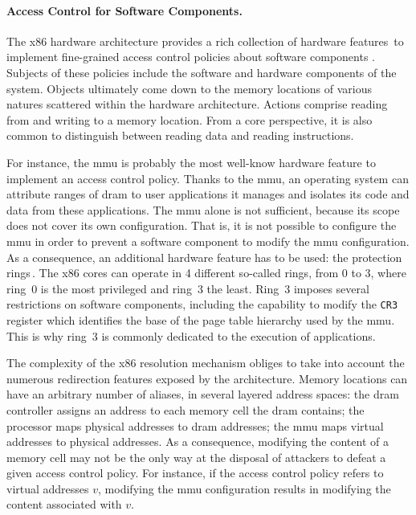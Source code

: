 \paragraph{Access Control for Software Components.}
%
The x86 hardware architecture provides a rich collection of hardware
features\,\cite[Volume 3]{intel2014manual} to implement fine-grained access
control policies about software components \IOs.
%
Subjects of these policies include the software and hardware components of the
system.
%
Objects ultimately come down to the memory locations of various natures
scattered within the hardware architecture.
%
Actions comprise reading from and writing to a memory location. From a core
perspective, it is also common to distinguish between reading data and reading
instructions.

For instance, the \ac{mmu} is probably the most well-know hardware feature to
implement an access control policy.
%
Thanks to the \ac{mmu}, an operating system can attribute ranges of \ac{dram} to
user applications it manages and isolates its code and data from these
applications.
%
The \ac{mmu} alone is not sufficient, because its scope does not cover its own
configuration.
%
That is, it is not possible to configure the \ac{mmu} in order to prevent a
software component to modify the \ac{mmu} configuration.
%
As a consequence, an additional hardware feature has to be used: the protection
rings\,\cite[Volume 3, Section 5.5]{intel2014manual}.
%
The x86 cores can operate in 4 different so-called rings, from 0 to 3, where
ring~0 is the most privileged and ring~3 the least.
%
Ring~3 imposes several restrictions on software components, including the
capability to modify the \texttt{CR3} register which identifies the base of the
page table hierarchy used by the \ac{mmu}.
%
This is why ring~3 is commonly dedicated to the execution of applications.

%
%

The complexity of the x86 \IO resolution mechanism obliges to take into account
the numerous redirection features exposed by the architecture.
%
Memory locations can have an arbitrary number of aliases, in several layered
address spaces: the \ac{dram} controller assigns an address to each memory cell
the \ac{dram} contains; the processor maps physical addresses to \ac{dram}
addresses; the \ac{mmu} maps virtual addresses to physical addresses.
%
As a consequence, modifying the content of a memory cell may not be the only way
at the disposal of attackers to defeat a given access control policy.
%
For instance, if the access control policy refers to virtual addresses \( v \),
modifying the \ac{mmu} configuration results in modifying the content associated
with \( v \).

